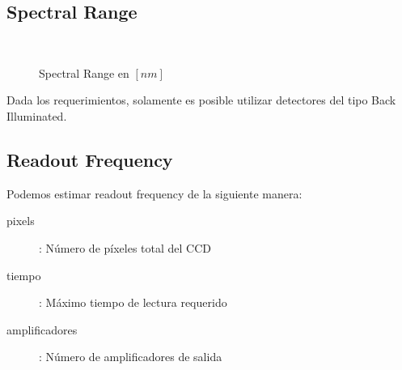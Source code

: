 \documentclass[a4paper,10pt]{article}
\begin{document}
\subsection{Spectral Range}
\begin{figure}[ht!]
  \centering
  ~ 
  \caption{Spectral Range en $[nm]$}
  \label{fig:p3_b}
\end{figure}
Dada los requerimientos, solamente es posible utilizar detectores del tipo Back Illuminated.
\subsection{Readout Frequency}
Podemos estimar readout frequency de la siguiente manera:
\begin{description}
\item [pixels]: Número de píxeles total del CCD
\item [tiempo]: Máximo tiempo de lectura requerido
\item [amplificadores]: Número de amplificadores de salida
\end{description}
\end{document}
